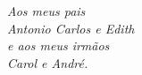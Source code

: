 \documentclass[12pt,oneside]{book} %
\begin{document}
%
%
%
%












\newpage
\thispagestyle{empty}

\begin{flushright}
 \begin{minipage}{5cm}
  \begin{flushright}
   \vspace{22cm}\textit{Aos meus pais \\ Antonio Carlos e Edith \\ e aos meus irmãos \\ Carol e André.}
  \end{flushright}
 \end{minipage}
\end{flushright}





\end{document}
